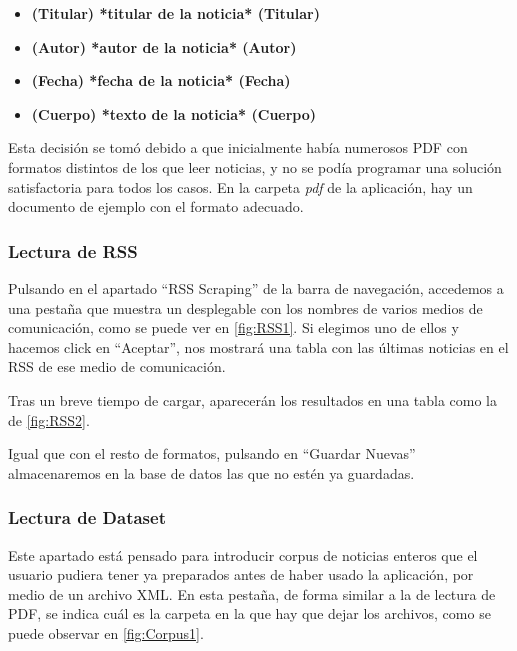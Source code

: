 \begin{itemize}

\item \textbf{(Titular) *titular de la noticia* (Titular)}  

\item \textbf{(Autor) *autor de la noticia* (Autor)}

\item \textbf{(Fecha) *fecha de la noticia* (Fecha)}

\item \textbf{(Cuerpo) *texto de la noticia* (Cuerpo)}

\end{itemize}

Esta decisión se tomó debido a que inicialmente había numerosos PDF con formatos distintos de los que leer noticias, y no se podía programar una solución satisfactoria para todos los casos. En la carpeta \emph{pdf} de la aplicación, hay un documento de ejemplo con el formato adecuado.

\subsubsection{Lectura de RSS}

Pulsando en el apartado ``RSS Scraping'' de la barra de navegación, accedemos a una pestaña que muestra un desplegable con los nombres de varios medios de comunicación, como se puede ver en \ref{fig:RSS1}. Si elegimos uno de ellos y hacemos click en ``Aceptar'', nos mostrará una tabla con las últimas noticias en el RSS de ese medio de comunicación.


Tras un breve tiempo de cargar, aparecerán los resultados en una tabla como la de \ref{fig:RSS2}.


Igual que con el resto de formatos, pulsando en ``Guardar Nuevas'' almacenaremos en la base de datos las que no estén ya guardadas.

\subsubsection{Lectura de Dataset}

Este apartado está pensado para introducir corpus de noticias enteros que el usuario pudiera tener ya preparados antes de haber usado la aplicación, por medio de un archivo XML. En esta pestaña, de forma similar a la de lectura de PDF, se indica cuál es la carpeta en la que hay que dejar los archivos, como se puede observar en \ref{fig:Corpus1}.

